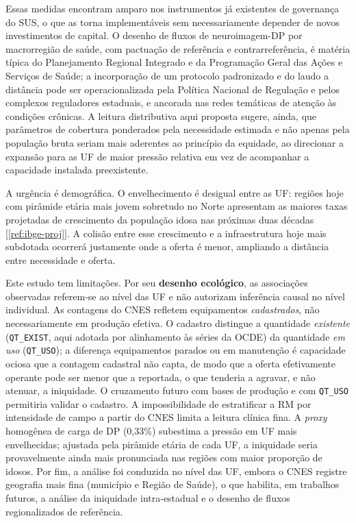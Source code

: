 \documentclass[12pt,a4paper,oneside]{article}
\begin{document}
Essas medidas encontram amparo nos instrumentos já existentes de
governança do SUS, o que as torna implementáveis sem necessariamente
depender de novos investimentos de capital. O desenho de fluxos de
neuroimagem-DP por macrorregião de saúde, com pactuação de referência e
contrarreferência, é matéria típica do Planejamento Regional Integrado
e da Programação Geral das Ações e Serviços de Saúde; a incorporação de
um protocolo padronizado e do laudo a distância pode ser operacionalizada
pela Política Nacional de Regulação e pelos complexos reguladores
estaduais, e ancorada nas redes temáticas de atenção às condições
crônicas. A leitura distributiva aqui proposta sugere, ainda, que
parâmetros de cobertura ponderados pela necessidade estimada
\textemdash{} e não apenas pela população bruta \textemdash{} seriam
mais aderentes ao princípio da equidade, ao direcionar a expansão para
as UF de maior pressão relativa em vez de acompanhar a capacidade
instalada preexistente.

A urgência é demográfica. O envelhecimento é desigual entre as UF:
regiões hoje com pirâmide etária mais jovem \textemdash{} sobretudo no
Norte \textemdash{} apresentam as maiores taxas projetadas de
crescimento da população idosa nas próximas duas
décadas\,[\ref{ref:ibge-proj}]. A colisão entre esse crescimento e a
infraestrutura hoje mais subdotada ocorrerá justamente onde a oferta é
menor, ampliando a distância entre necessidade e oferta.

Este estudo tem limitações. Por seu \textbf{desenho ecológico}, as
associações observadas referem-se ao nível das UF e não autorizam
inferência causal no nível individual. As contagens do CNES refletem
equipamentos \textit{cadastrados}, não necessariamente em produção
efetiva. O cadastro distingue a quantidade \textit{existente}
(\texttt{QT\_EXIST}, aqui adotada por alinhamento às séries da OCDE) da
quantidade \textit{em uso} (\texttt{QT\_USO}); a diferença
\textemdash{} equipamentos parados ou em manutenção \textemdash{} é
capacidade ociosa que a contagem cadastral não capta, de modo que a
oferta efetivamente operante pode ser menor que a reportada, o que
tenderia a agravar, e não atenuar, a iniquidade. O cruzamento futuro
com bases de produção e com \texttt{QT\_USO} permitiria validar o
cadastro. A impossibilidade de estratificar a RM por intensidade de
campo a partir do CNES limita a leitura clínica fina. A
\textit{proxy} homogênea de carga de DP (0,33\%) subestima a pressão em
UF mais envelhecidas; ajustada pela pirâmide etária de cada UF, a
iniquidade seria provavelmente ainda mais pronunciada nas regiões com
maior proporção de idosos. Por fim, a análise foi conduzida no nível
das UF, embora o CNES registre geografia mais fina (município e Região
de Saúde), o que habilita, em trabalhos futuros, a análise da
iniquidade intra-estadual e o desenho de fluxos regionalizados de
referência.
\end{document}
